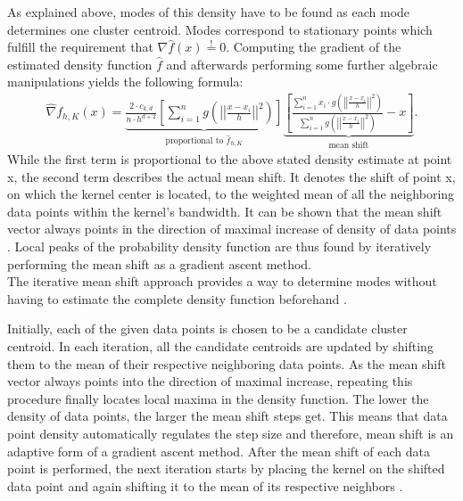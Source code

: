 As explained above, modes of this density have to be found as each mode determines one cluster centroid. Modes correspond to stationary points which fulfill the requirement that $\nabla \hat{f}(x) \overset{!}{=} 0$. Computing the gradient of the estimated density function $\hat{f}$ and afterwards performing some further algebraic manipulations yields the following formula:
\begin{align*}
	\hat{\nabla} f_{h,K}(x) = \underbrace{\frac{2 \cdot c_{k, d}}{n \cdot h^{d+2}} \left[ \sum_{i=1}^{n} g \left( \left| \left| \frac{x-x_{i}}{h} \right| \right| ^{2} \right) \right]}_{\text{proportional to $\hat{f}_{h, K}$}}\underbrace{ \left[ \frac{\sum_{i=1}^{n} x_{i} \cdot g \left( \left| \left| \frac{x-x_{i}}{h} \right| \right| ^{2} \right)}{\sum_{i=1}^{n} g \left( \left| \left| \frac{x-x_{i}}{h} \right| \right| ^{2} \right)} - x \right]}_{\text{mean shift}}.
\end{align*}
While the first term is proportional to the above stated density estimate at point x, the second term describes the actual mean shift. It denotes the shift of point x, on which the kernel center is located, to the weighted mean of all the neighboring data points within the kernel's bandwidth. It can be shown that the mean shift vector always points in the direction of maximal increase of density of data points \cite{comaniciu2002MeanShift}. 
Local peaks of the probability density function are thus found by iteratively performing the mean shift as a gradient ascent method.\\
The iterative mean shift approach provides a way to determine modes without having to estimate the complete density function beforehand \cite{comaniciu2002MeanShift}.

Initially, each of the given data points is chosen to be a candidate cluster centroid. In each iteration, all the candidate centroids are updated by shifting them to the mean of their respective neighboring data points. As the mean shift vector always points into the direction of maximal increase, repeating this procedure finally locates local maxima in the density function.
The lower the density of data points, the larger the mean shift steps get. This means that data point density automatically regulates the step size and therefore, mean shift is an adaptive form of a gradient ascent method. 
After the mean shift of each data point is performed, the next iteration starts by placing the kernel on the shifted data point and again shifting it to the mean of its respective neighbors \cite{400568}. 

